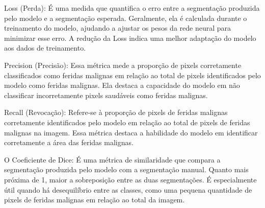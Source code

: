 Loss (Perda): É uma medida que quantifica o erro entre a segmentação produzida pelo modelo e a segmentação esperada. Geralmente, ela é calculada durante o treinamento do modelo, ajudando a ajustar os pesos da rede neural para minimizar esse erro. A redução da Loss indica uma melhor adaptação do modelo aos dados de treinamento.

Precision (Precisão): Essa métrica mede a proporção de pixels corretamente classificados como feridas malignas em relação ao total de pixels identificados pelo modelo como feridas malignas. Ela destaca a capacidade do modelo em não classificar incorretamente pixels saudáveis como feridas malignas.

Recall (Revocação): Refere-se à proporção de pixels de feridas malignas corretamente identificados pelo modelo em relação ao total de pixels de feridas malignas na imagem. Essa métrica destaca a habilidade do modelo em identificar corretamente a área das feridas malignas.

O Coeficiente de Dice: É uma métrica de similaridade que compara a segmentação produzida pelo modelo com a segmentação manual. Quanto mais próxima de 1, maior a sobreposição entre as duas segmentações. É especialmente útil quando há desequilíbrio entre as classes, como uma pequena quantidade de pixels de feridas malignas em relação ao total da imagem.